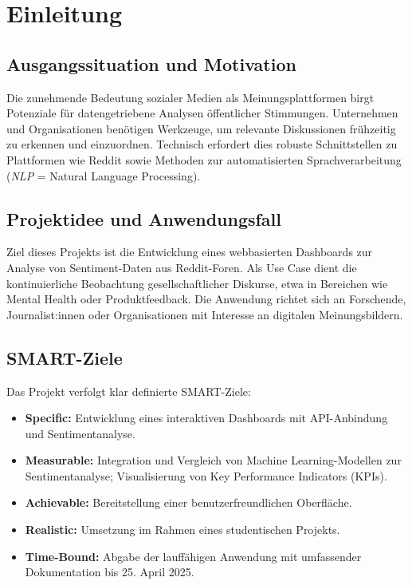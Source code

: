 \section{Einleitung}

\subsection{Ausgangssituation und Motivation}
Die zunehmende Bedeutung sozialer Medien als Meinungsplattformen birgt Potenziale für datengetriebene Analysen öffentlicher Stimmungen. Unternehmen und Organisationen benötigen Werkzeuge, um relevante Diskussionen frühzeitig zu erkennen und einzuordnen. Technisch erfordert dies robuste Schnittstellen zu Plattformen wie Reddit sowie Methoden zur automatisierten Sprachverarbeitung (\emph{NLP} = Natural Language Processing).

\subsection{Projektidee und Anwendungsfall}
Ziel dieses Projekts ist die Entwicklung eines webbasierten Dashboards zur Analyse von Sentiment-Daten aus Reddit-Foren. Als Use Case dient die kontinuierliche Beobachtung gesellschaftlicher Diskurse, etwa in Bereichen wie Mental Health oder Produktfeedback. Die Anwendung richtet sich an Forschende, Journalist:innen oder Organisationen mit Interesse an digitalen Meinungsbildern.

\subsection{SMART-Ziele}
Das Projekt verfolgt klar definierte SMART-Ziele:
\begin{itemize}
    \item \textbf{Specific:} Entwicklung eines interaktiven Dashboards mit API-Anbindung und Sentimentanalyse.
    \item \textbf{Measurable:} Integration und Vergleich von Machine Learning-Modellen zur Sentimentanalyse; Visualisierung von Key Performance Indicators (KPIs).
    \item \textbf{Achievable:} Bereitstellung einer benutzerfreundlichen Oberfläche.
    \item \textbf{Realistic:} Umsetzung im Rahmen eines studentischen Projekts.
    \item \textbf{Time-Bound:} Abgabe der lauffähigen Anwendung mit umfassender Dokumentation bis 25. April 2025.
\end{itemize}